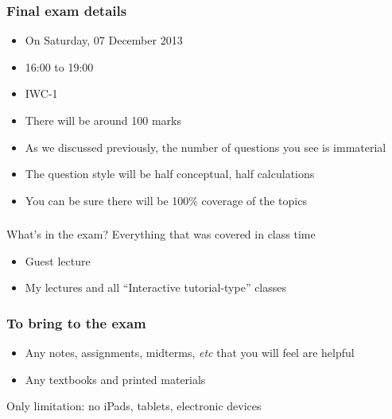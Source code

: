 
\begin{frame}\frametitle{Final exam details}
	\begin{itemize}
		\item	On Saturday, 07 December 2013
		\item	16:00 to 19:00
		\item	IWC-1
		\item	There will be around 100 marks
		\item	As we discussed previously, the number of questions you see is immaterial
		\item	The question style will be half conceptual, half calculations
		\item	You can be sure there will be 100\% coverage of the topics
	\end{itemize}
\end{frame}

\begin{frame}\frametitle{}
	\begin{exampleblock}{What's in the exam?}
		Everything that was covered in class time
	\end{exampleblock}
	\vspace{24pt}
	\begin{itemize}
		\item	Guest lecture
		\item	My lectures and all ``Interactive tutorial-type'' classes 
	\end{itemize}	
\end{frame}

\begin{frame}\frametitle{To bring to the exam}
	\begin{itemize}
		\item	Any notes, assignments, midterms, \emph{etc} that you will feel are helpful
		\item	Any textbooks and printed materials
	\end{itemize}
	Only limitation: no iPads, tablets, electronic devices
\end{frame}

